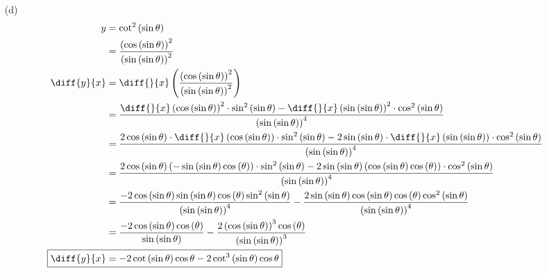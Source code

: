 \documentclass{article}
\begin{document}
\begin{itemize}
\item[(d)]
    \begin{align*}
        y&=\cot^2\left(\sin\theta\right) \\
        &=\frac{\left(\cos\left(\sin\theta\right)\right)^2}{\left(\sin\left(\sin\theta\right)\right)^2} \\
        \diff{y}{x}&=\diff{}{x}\left(\frac{\left(\cos\left(\sin\theta\right)\right)^2}{\left(\sin\left(\sin\theta\right)\right)^2}\right) \\
        &=\frac{\diff{}{x}\left(\cos\left(\sin\theta\right)\right)^2\cdot\sin^2\left(\sin\theta\right)-\diff{}{x}\left(\sin\left(\sin\theta\right)\right)^2\cdot\cos^2\left(\sin\theta\right)}{\left(\sin\left(\sin\theta\right)\right)^4} \\
        &=\frac{2\cos\left(\sin\theta\right)\cdot\diff{}{x}\left(\cos\left(\sin\theta\right)\right)\cdot\sin^2\left(\sin\theta\right)-2\sin\left(\sin\theta\right)\cdot\diff{}{x}\left(\sin\left(\sin\theta\right)\right)\cdot\cos^2\left(\sin\theta\right)}{\left(\sin\left(\sin\theta\right)\right)^4} \\
        &=\frac{2\cos\left(\sin\theta\right)\left(-\sin\left(\sin\theta\right)\cos\left(\theta\right)\right)\cdot\sin^{2}\left(\sin\theta\right)-2\sin\left(\sin\theta\right)\left(\cos\left(\sin\theta\right)\cos\left(\theta\right)\right)\cdot\cos^{2}\left(\sin\theta\right)}{\left(\sin\left(\sin\theta\right)\right)^{4}} \\
        &=\frac{-2\cos\left(\sin\theta\right)\sin\left(\sin\theta\right)\cos\left(\theta\right)\sin^{2}\left(\sin\theta\right)}{\left(\sin\left(\sin\theta\right)\right)^{4}}-\frac{2\sin\left(\sin\theta\right)\cos\left(\sin\theta\right)\cos\left(\theta\right)\cos^{2}\left(\sin\theta\right)}{\left(\sin\left(\sin\theta\right)\right)^{4}} \\
        &=\frac{-2\cos\left(\sin\theta\right)\cos\left(\theta\right)}{\sin\left(\sin\theta\right)}-\frac{2\left(\cos\left(\sin\theta\right)\right)^3\cos\left(\theta\right)}{\left(\sin\left(\sin\theta\right)\right)^{3}} \\
        \Aboxed{\diff{y}{x}&=-2\cot\left(\sin\theta\right)\cos\theta-2\cot^3\left(\sin\theta\right)\cos\theta} \\
    \end{align*}


\end{itemize}
\end{document}
